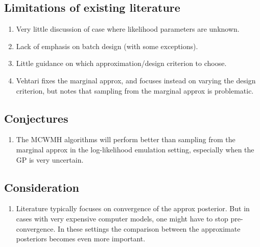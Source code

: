 \documentclass[12pt]{article}
\begin{document}
\subsection{Limitations of existing literature}
\begin{enumerate}
\item Very little discussion of case where likelihood parameters are unknown. 
\item Lack of emphasis on batch design (with some exceptions).
\item Little guidance on which approximation/design criterion to choose.
\item Vehtari fixes the marginal approx, and focuses instead on varying the design criterion, but notes that sampling from the marginal approx is problematic. 
\end{enumerate}

\subsection{Conjectures}
\begin{enumerate}
\item The MCWMH algorithms will perform better than sampling from the marginal approx in the log-likelihood emulation setting, especially when the GP is very uncertain. 
\end{enumerate}

\subsection{Consideration}
\begin{enumerate}
\item Literature typically focuses on convergence of the approx posterior. But in cases with very expensive computer models, one might have to stop pre-convergence. 
In these settings the comparison between the approximate posteriors becomes even more important. 
\end{enumerate}



 

\end{document}
